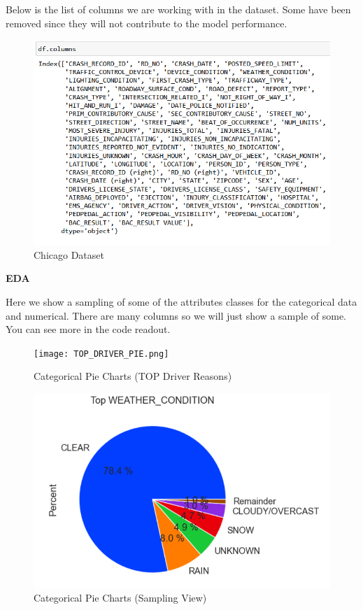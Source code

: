 \documentclass[conference]{IEEEtran}
\begin{document}
Below is the list of columns we are working with in the dataset.  Some have been removed since they will not contribute to the model performance.
\begin{figure}[!h]
	\includegraphics[width=\linewidth]{Chicago_Column.png}
	\caption{Chicago Dataset}
	\label{fig: Chicago Dataset for Crashes and People involved}
 \end{figure}
 \begin{center} 
	\textbf{EDA} 
	\end{center}
Here we show a sampling of some of the attributes classes for the categorical data and numerical.  There are many columns so we will just show a sample of some. You can see more in the code readout. 
\begin{figure}[!h]
	\texttt{[image: TOP\_DRIVER\_PIE.png]}
	\caption{Categorical Pie Charts (TOP Driver Reasons)}
	\label{fig: Top Driver Condition Pie chart}
 \end{figure}


\begin{figure}[!h]
	\includegraphics[width=\linewidth]{TOP_WEATHER_CONDITION_PIE.png}
	\caption{Categorical Pie Charts (Sampling View)}
	\label{fig: Top_Weather_Condition Pie chart}
 \end{figure}
\end{document}
